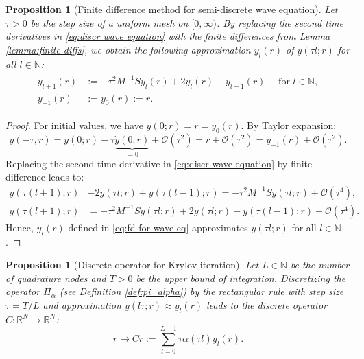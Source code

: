 \documentclass[a4paper,11pt,bibliography=totoc,listof=totoc,headinclude=true,cleardoublepage=empty,oneside]{scrbook}
\newtheorem{prop}[theorem]{Proposition}
\newcommand{\R}{\mathbb{R}}
\newcommand{\N}{\mathbb{N}}
\newcommand{\bigO}{\mathcal{O}}
\begin{document}
\begin{prop}[Finite difference method for semi-discrete wave equation]
    Let $\tau>0$ be the step size of a uniform mesh on $[0, \infty)$. By replacing the second time derivatives in \eqref{eq:discr wave equation} with the finite differences from Lemma \ref{lemma:finite diffs}, we obtain the following approximation $y_l(r)$ of $y(\tau l; r)$ for all $l \in \N$:
    \begin{align}\label{eq:fd for wave eq}
    \begin{split}
        y_{l+1}(r) &:= -\tau^2M^{-1}S y_l(r) + 2y_l(r) - y_{l-1}(r) \quad \text{ for } l \in \N, \\
        y_{-1}(r) &:= y_0(r) := r.
    \end{split}
    \end{align}
\end{prop}
\begin{proof}
    For initial values, we have $y(0; r) = r = y_0(r)$. By Taylor expansion:
    \begin{equation*}
        y(-\tau, r) = y(0; r) - \tau \underbrace{\dot{y}(0; r)}_{=0} + \bigO(\tau^2) = r + \bigO(\tau^2) = y_{-1}(r) + \bigO(\tau^2).
    \end{equation*} 
    Replacing the second time derivative in \eqref{eq:discr wave equation} by finite difference leads to:
    \begin{align*}
        y(\tau(l+1); r) &- 2 y(\tau l; r) + y(\tau(l-1); r) = -\tau^2 M^{-1}S y(\tau l; r) + \bigO(\tau^4), \\
        y(\tau(l+1); r) &= -\tau^2 M^{-1}S y(\tau l; r) + 2y(\tau l; r) - y(\tau (l-1); r) + \bigO(\tau^4).
    \end{align*}
    Hence, $y_l(r)$ defined in \eqref{eq:fd for wave eq} approximates $y(\tau l; r)$ for all $l \in \N$.
\end{proof}

\begin{prop}[Discrete operator for Krylov iteration]\label{prop:C operator}
    Let $L \in \N$ be the number of quadrature nodes and $T>0$ be the upper bound of integration. Discretizing the operator $\Pi_\alpha$ (see Definition \ref{def:pi_alpha}) by the rectangular rule with step size $\tau = T/L$ and approximation $y(l\tau; r) \approx y_l(r)$ leads to the discrete operator $C : \R^N \rightarrow \R^N$:
    \begin{equation}\label{eq:C operator}
        r \mapsto Cr := \sum_{l=0}^{L-1} \tau \alpha(\tau l) y_l(r).
    \end{equation}
\end{prop}
\end{document}
